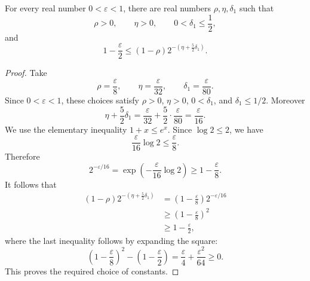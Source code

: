 \begin{helper}
For every real number \(0<\varepsilon<1\), there are real numbers
\(\rho,\eta,\delta_1\) such that
\[
  \rho>0,\qquad \eta>0,\qquad 0<\delta_1\le\frac12,
\]
and
\[
  1-\frac{\varepsilon}{2}
  \le
  (1-\rho)2^{-(\eta+\frac52\delta_1)}.
\]
\end{helper}
\begin{proof}
Take
\[
  \rho=\frac{\varepsilon}{8},\qquad
  \eta=\frac{\varepsilon}{32},\qquad
  \delta_1=\frac{\varepsilon}{80}.
\]
Since \(0<\varepsilon<1\), these choices satisfy
\(\rho>0\), \(\eta>0\), \(0<\delta_1\), and \(\delta_1\le1/2\).
Moreover
\[
  \eta+\frac52\delta_1
  =\frac{\varepsilon}{32}+\frac52\cdot\frac{\varepsilon}{80}
  =\frac{\varepsilon}{16}.
\]
We use the elementary inequality \(1+x\le e^x\).  Since
\(\log 2\le2\), we have
\[
  \frac{\varepsilon}{16}\log 2\le\frac{\varepsilon}{8}.
\]
Therefore
\[
  2^{-\varepsilon/16}
  =\exp\!\left(-\frac{\varepsilon}{16}\log2\right)
  \ge 1-\frac{\varepsilon}{8}.
\]
It follows that
\[
\begin{aligned}
  (1-\rho)2^{-(\eta+\frac52\delta_1)}
  &=
  \left(1-\frac{\varepsilon}{8}\right)2^{-\varepsilon/16}\\
  &\ge
  \left(1-\frac{\varepsilon}{8}\right)^2\\
  &\ge
  1-\frac{\varepsilon}{2},
\end{aligned}
\]
where the last inequality follows by expanding the square:
\[
  \left(1-\frac{\varepsilon}{8}\right)^2
  -\left(1-\frac{\varepsilon}{2}\right)
  =
  \frac{\varepsilon}{4}+\frac{\varepsilon^2}{64}\ge0.
\]
This proves the required choice of constants.
\end{proof}
